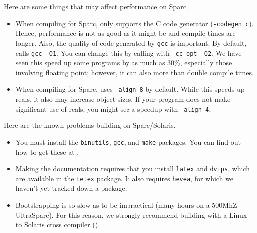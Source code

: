 
Here are some things that may affect performance on Sparc.
\begin{itemize}

\item
When compiling for Sparc, {\mlton} only supports the C code generator
({\tt -codegen c}).  Hence, performance is not as good as it might
be and compile times are longer.  Also, the quality of code generated
by {\tt gcc} is important.  By default, {\mlton} calls {\tt gcc -O1}.
You can change this by calling {\mlton} with {\tt -cc-opt -O2}.  We
have seen this speed up some programs by as much as 30\%, especially
those involving floating point; however, it can also more than double
compile times.

\item
When compiling for Sparc, {\mlton} uses {\tt -align 8} by default.
While this speeds up reals, it also may increase object sizes.  If
your program does not make significant use of reals, you might see a
speedup with {\tt -align 4}.

\end{itemize}
Here are the known problems building {\mlton} on Sparc/Solaris.

\begin{itemize}

\item You must install the {\tt binutils}, {\tt gcc}, and {\tt make}
packages.  You can find out how to get these at
.

\item Making the documentation requires that you install {\tt latex}
and {\tt dvips}, which are available in the {\tt tetex} package.  It
also requires {\tt hevea}, for which we haven't yet tracked down a
package.

\item Bootstrapping is so slow as to be impractical (many hours on a
500MhZ UltraSparc).  For this reason, we strongly recommend building
with a Linux to Solaris cross compiler ().

\end{itemize}
